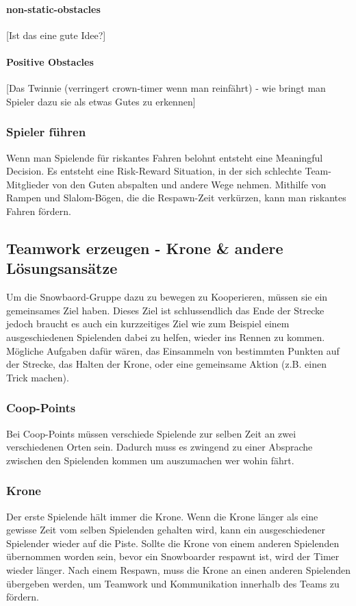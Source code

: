 \paragraph{non-static-obstacles}
[Ist das eine gute Idee?]

\paragraph{Positive Obstacles}
[Das Twinnie (verringert crown-timer wenn man reinfährt) - wie bringt man Spieler dazu sie als etwas Gutes zu erkennen]

\subsubsection{Spieler führen}
Wenn man Spielende für riskantes Fahren belohnt entsteht eine Meaningful Decision. Es entsteht eine Risk-Reward Situation, in der sich schlechte Team-Mitglieder von den Guten abspalten und andere Wege nehmen. Mithilfe von Rampen und Slalom-Bögen, die die Respawn-Zeit verkürzen, kann man riskantes Fahren fördern.

\subsection{Teamwork erzeugen - Krone \& andere Lösungsansätze\label{_teamwork_erzeugen}}
Um die Snowbaord-Gruppe dazu zu bewegen zu Kooperieren, müssen sie ein gemeinsames Ziel haben. Dieses Ziel ist schlussendlich das Ende der Strecke jedoch braucht es auch ein kurzzeitiges Ziel wie zum Beispiel einem ausgeschiedenen Spielenden dabei zu helfen, wieder ins Rennen zu kommen. Mögliche Aufgaben dafür wären, das Einsammeln von bestimmten Punkten auf der Strecke, das Halten der Krone, oder eine gemeinsame Aktion (z.B. einen Trick machen).

\subsubsection{Coop-Points}
Bei Coop-Points müssen verschiede Spielende zur selben Zeit an zwei verschiedenen Orten sein. Dadurch muss es zwingend zu einer Absprache zwischen den Spielenden kommen um auszumachen wer wohin fährt.

\subsubsection{Krone\label{_krone}}
Der erste Spielende hält immer die Krone. Wenn die Krone länger als eine gewisse Zeit vom selben Spielenden gehalten wird, kann ein ausgeschiedener Spielender wieder auf die Piste. Sollte die Krone von einem anderen Spielenden übernommen worden sein, bevor ein Snowboarder respawnt ist, wird der Timer wieder länger. Nach einem Respawn, muss die Krone an einen anderen Spielenden übergeben werden, um Teamwork und Kommunikation innerhalb des Teams zu fördern.

